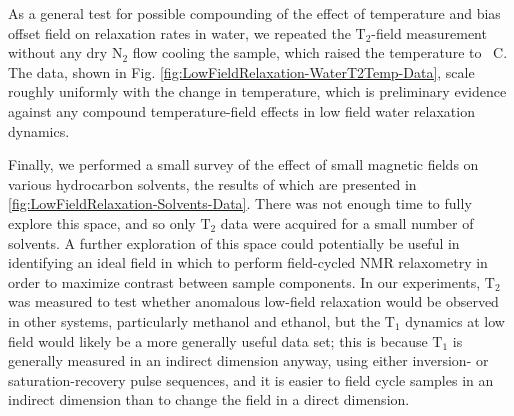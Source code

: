 \documentclass[PaulGanssle-Thesis.tex]{subfiles}
\begin{document}
As a general test for possible compounding of the effect of temperature and bias offset field on relaxation rates in water, we repeated the $\mathrm{T}_{2}$-field measurement without any dry N$_2$ flow cooling the sample, which raised the temperature to \unit[47]{\degsym C}. The data, shown in Fig. \ref{fig:LowFieldRelaxation-WaterT2Temp-Data}, scale roughly uniformly with the change in temperature, which is preliminary evidence against any compound temperature-field effects in low field water relaxation dynamics.

Finally, we performed a small survey of the effect of small magnetic fields on various hydrocarbon solvents, the results of which are presented in \ref{fig:LowFieldRelaxation-Solvents-Data}. There was not enough time to fully explore this space, and so only $\mathrm{T}_{2}$ data were acquired for a small number of solvents. A further exploration of this space could potentially be useful in identifying an ideal field in which to perform field-cycled NMR relaxometry in order to maximize contrast between sample components. In our experiments, $\mathrm{T}_{2}$ was measured to test whether anomalous low-field relaxation would be observed in other systems, particularly methanol and ethanol, but the $\mathrm{T}_{1}$ dynamics at low field would likely be a more generally useful data set; this is because $\mathrm{T}_{1}$ is generally measured in an indirect dimension anyway, using either inversion- or saturation-recovery pulse sequences, and it is easier to field cycle samples in an indirect dimension than to change the field in a direct dimension. 
\end{document}
